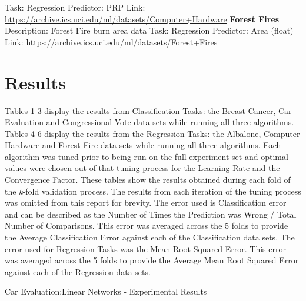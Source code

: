 \documentclass[twoside,11pt]{article}
\begin{document}
Task: Regression\newline
Predictor: PRP\newline
Link: \newline
\url{https://archive.ics.uci.edu/ml/datasets/Computer+Hardware}\newline
{\noindent}\textbf{Forest Fires}\newline
Description: Forest Fire burn area data\newline
Task: Regression\newline
Predictor: Area (float)\newline
Link: \newline
\url{https://archive.ics.uci.edu/ml/datasets/Forest+Fires}\newline
	
\newpage

\section{Results}
Tables 1-3 display the results from Classification Tasks: the Breast Cancer, Car Evaluation and Congressional Vote data sets while running all three algorithms. Tables 4-6 display the results from the Regression Tasks: the Albalone, Computer Hardware and Forest Fire data sets while running all three algorithms. Each algorithm was tuned prior to being run on the full experiment set and optimal values were chosen out of that tuning process for the Learning Rate and the Convergence Factor. These tables show the results obtained during each fold of the \textit{k}-fold validation process. The results from each iteration of the tuning process was omitted from this report for brevity. The error used is Classification error and can be described as the Number of Times the Prediction was Wrong / Total Number of Comparisons. This error was averaged across the 5 folds to provide the Average Classification Error against each of the Classification data sets. The error used for Regression Tasks was the Mean Root Squared Error. This error was averaged across the 5 folds to provide the Average Mean Root Squared Error against each of the Regression data sets.\newline


\begin{table}[h]
		\centering
		\caption{Car Evaluation:Linear Networks - Experimental Results}
		\label{tab:table1}
\end{table}
\end{document}
